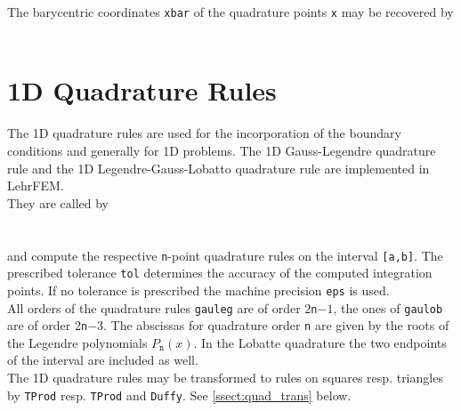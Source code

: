  The barycentric coordinates {\tt xbar} of the quadrature points {\tt x} may be recovered by \\

 \\




\section{1D Quadrature Rules} \label{sect:quad_rule_1d} 

 The 1D quadrature rules are used for the incorporation of the boundary conditions and generally for 1D problems. The 1D Gauss-Legendre quadrature rule  and the 1D Legendre-Gauss-Lobatto quadrature rule  are implemented in LehrFEM. \\

 They are called by \\

 \\
 \\

 and compute the respective {\tt n}-point quadrature rules on the interval {\tt [a,b]}. The prescribed tolerance {\tt tol} determines the accuracy of the computed integration points. If no tolerance is prescribed the machine precision {\tt eps} is used. \\

 All orders of the quadrature rules {\tt gauleg} are of order $2${\tt n}$-1$, the ones of {\tt gaulob} are of order $2${\tt n}$-3$. The abscissas for quadrature order {\tt n} are given by the roots of the Legendre polynomials $P_{\mathtt{n}}(x)$. In the Lobatte quadrature the two endpoints of the interval are included as well. \\

 The 1D quadrature rules may be transformed to rules on squares resp. triangles by {\tt TProd} resp. {\tt TProd} and {\tt Duffy}. See \ref{ssect:quad_trans} below.


